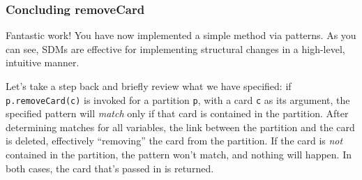 \newpage
\genHeader
\hypertarget{remCard end}{}
\subsubsection{Concluding removeCard}

Fantastic work! You have now implemented a simple method via patterns. As you can see, SDMs are effective for implementing structural changes in a high-level,
intuitive manner.

Let's take a step back and briefly review what we have specified:  if \texttt{p.remove\-Card(c)} is invoked for a partition \texttt{p}, with a card \texttt{c}
as its argument, the specified pattern will \emph{match} only if that card is contained in the partition. After determining matches for all variables, the
link between the partition and the card is deleted, effectively ``removing'' the card from the partition. If the card is \emph{not} contained in the partition,
the pattern won't match, and nothing will happen. In both cases, the card that's passed in is returned.

